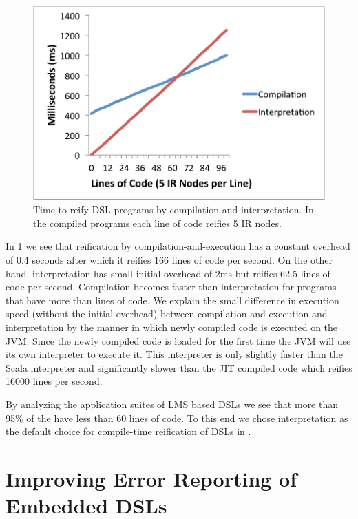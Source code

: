 \begin{figure}[!ht]
\centering
\includegraphics[scale=0.75]{diagrams/interpretation-vs-compilation.pdf}
\caption{Time to reify DSL programs by compilation and interpretation. In the compiled programs each line
 of code reifies 5 IR nodes.}
\label{fig:interpretation-vs-compilation}
\end{figure}


In \ref{fig:interpretation-vs-compilation} we see that reification by
 compilation-and-execution has a constant overhead of 0.4 seconds after which it reifies 166 lines of code per second. On the other hand, interpretation has small initial overhead of 2ms but reifies 62.5 lines of code per second.
 Compilation becomes faster than interpretation for programs that have more than  lines of code.
 We explain the small difference in execution speed (without the initial overhead) between compilation-and-execution and interpretation by the manner in which newly compiled code is executed on the JVM. Since the newly compiled code is loaded for the first time
 the JVM will use its own interpreter to execute it. This interpreter is only slightly faster than
 the Scala interpreter and significantly slower than the JIT compiled code which reifies 16000 lines per second.

By analyzing the application suites of LMS based DSLs we see that more than 95\% of the
 have less than 60 lines of code. To this end we chose interpretation as the default
 choice for compile-time reification of DSLs in \yy.


\chapter{Improving Error Reporting of Embedded DSLs}
\label{sec:error-reporting}

